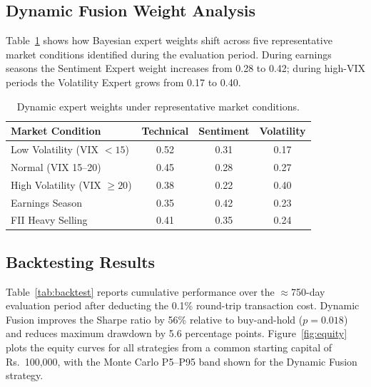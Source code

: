 \documentclass[10pt,a4paper,twoside]{article}
\begin{document}
\subsection{Dynamic Fusion Weight Analysis}

Table~\ref{tab:fusion_weights} shows how Bayesian expert weights shift across
five representative market conditions identified during the evaluation period.
During earnings seasons the Sentiment Expert weight increases from 0.28 to 0.42;
during high-VIX periods the Volatility Expert grows from 0.17 to 0.40.

\begin{table}[htb]
  \begin{center}
    {\caption{Dynamic expert weights under representative market
    conditions.}\label{tab:fusion_weights}}
    \begin{tabular}{|l|c|c|c|}
    \hline
    \textbf{Market Condition} & \textbf{Technical} & \textbf{Sentiment} & \textbf{Volatility} \\
    \hline
    Low Volatility (VIX $< 15$) & 0.52 & 0.31 & 0.17 \\
    Normal (VIX 15--20) & 0.45 & 0.28 & 0.27 \\
    High Volatility (VIX $\geq 20$) & 0.38 & 0.22 & 0.40 \\
    Earnings Season & 0.35 & 0.42 & 0.23 \\
    FII Heavy Selling & 0.41 & 0.35 & 0.24 \\
    \hline
    \end{tabular}
  \end{center}
\end{table}

\subsection{Backtesting Results}

Table~\ref{tab:backtest} reports cumulative performance over the $\approx$750-day
evaluation period after deducting the 0.1\% round-trip transaction cost.
Dynamic Fusion improves the Sharpe ratio by 56\% relative to buy-and-hold
($p = 0.018$) and reduces maximum drawdown by 5.6 percentage points.
Figure~\ref{fig:equity} plots the equity curves for all strategies from a
common starting capital of Rs.~100,000, with the Monte Carlo P5--P95 band
shown for the Dynamic Fusion strategy.
\end{document}
